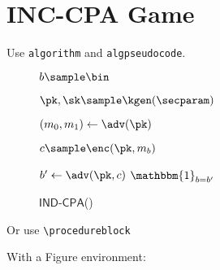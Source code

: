 





\maketitle

\section{INC-CPA Game}

Use \texttt{algorithm} and \texttt{algpseudocode}.
\begin{figure}[h]
\centering

    \begin{minipage}{0.4\linewidth}
    \centering
    \begin{algorithm}[H]
    \caption{$\mathsf{IND\text{-}CPA}$(\adv)}
    \label{alg:ind-cpa}
    \begin{algorithmic}[1]
		\State $b \sample \bin$

        \State $\pk, \sk \sample \kgen(\secparam)$
        
        \State $(m_0, m_1) \gets \adv(\pk)$

        \State $c \sample \enc(\pk, m_b)$

        \State $b^\prime \gets \adv(\pk, c)$
        \State \Return $\mathbbm{1}_{b = b^\prime}$
    \end{algorithmic}
    \end{algorithm}
    \end{minipage}

\end{figure}

Or use \texttt{\textbackslash procedureblock}


With a Figure environment:

